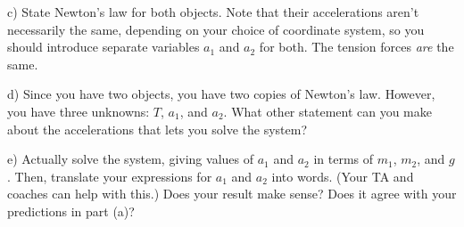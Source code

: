 \documentclass[12pt]{article}
\begin{document}
		c) State Newton's law for both objects. Note that their accelerations aren't necessarily the same, depending on your choice of coordinate system, so you should introduce separate variables $a_1$ and $a_2$ for both. The tension forces
		{\it are} the same.
		
		\newpage
		
		d) Since you have two objects, you have two copies of Newton's law. However, you have three unknowns: $T$, $a_1$, and $a_2$. What other statement can you make about the accelerations that lets you solve the system?
		
		\vspace{3in}
		
		e) Actually solve the system, giving values of $a_1$ and $a_2$ in terms of $m_1$, $m_2$, and $g$. Then, translate
		your expressions for $a_1$ and $a_2$ into words. (Your TA and coaches can help with this.) Does your result make sense?
		Does it agree with your predictions in part (a)?
		
	
\end{document}
